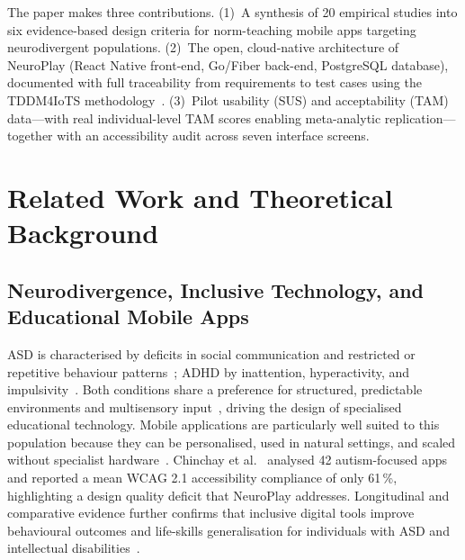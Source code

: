 \documentclass[preprint,12pt]{elsarticle}
\begin{document}
        The paper makes three contributions. (1)~A synthesis of 20 empirical studies into six evidence-based design criteria for norm-teaching mobile apps targeting neurodivergent populations. (2)~The open, cloud-native architecture of NeuroPlay (React Native front-end, Go/Fiber back-end, PostgreSQL database), documented with full traceability from requirements to test cases using the TDDM4IoTS methodology~\cite{Guerrero2020,GuerreroIEEE2025}. (3)~Pilot usability (SUS) and acceptability (TAM) data---with real individual-level TAM scores enabling meta-analytic replication---together with an accessibility audit across seven interface screens.
    \section{Related Work and Theoretical Background}
    \label{sec:related}
        \subsection{Neurodivergence, Inclusive Technology, and Educational Mobile Apps}
            ASD is characterised by deficits in social communication and restricted or repetitive behaviour patterns~\cite{Armstrong2012}; ADHD by inattention, hyperactivity, and impulsivity~\cite{polanczyk2015adhd}. Both conditions share a preference for structured, predictable environments and multisensory input~\cite{Kalantari2025}, driving the design of specialised educational technology. Mobile applications are particularly well suited to this population because they can be personalised, used in natural settings, and scaled without specialist hardware~\cite{Toma2024}. Chinchay et al.~\cite{Chinchay2024} analysed 42 autism-focused apps and reported a mean WCAG 2.1 accessibility compliance of only 61\,\%, highlighting a design quality deficit that NeuroPlay addresses. Longitudinal and comparative evidence further confirms that inclusive digital tools improve behavioural outcomes and life-skills generalisation for individuals with ASD and intellectual disabilities~\cite{Sanchez2022}.
        
\end{document}
